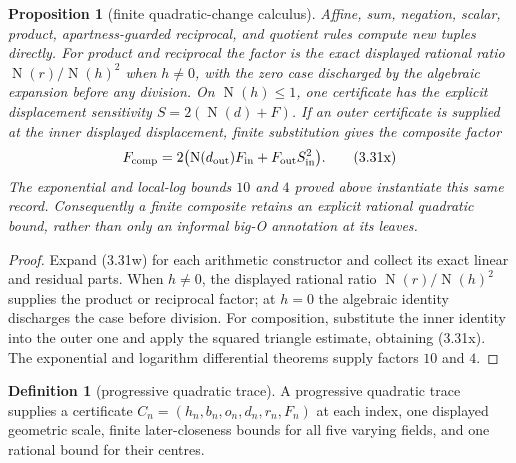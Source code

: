 \documentclass[10pt]{article}
\newtheorem{proposition}[theorem]{Proposition}
\theoremstyle{definition}
\newtheorem{definition}[theorem]{Definition}
\theoremstyle{remark}
\newcommand{\Norm}{\operatorname{N}}
\begin{document}
\begin{proposition}[finite quadratic-change calculus]
Affine, sum, negation, scalar, product, apartness-guarded reciprocal, and
quotient rules compute new tuples directly.  For product and reciprocal the
factor is the exact displayed rational ratio
$\Norm(r)/\Norm(h)^2$ when $h\ne0$, with the zero case discharged by the
algebraic expansion before any division.  On $\Norm(h)\le1$, one certificate
has the explicit displacement sensitivity
$S=2(\Norm(d)+F)$.  If an outer certificate is supplied at the inner displayed
displacement, finite substitution gives the composite factor
\[
 F_{\rm comp}=2\bigl(\Norm(d_{\rm out})F_{\rm in}
              +F_{\rm out}S_{\rm in}^{2}\bigr).
 \tag{3.31x}
\]
The exponential and local-log bounds $10$ and $4$ proved above instantiate
this same record.  Consequently a finite composite retains an explicit
rational quadratic bound, rather than only an informal big-O annotation at
its leaves.
\end{proposition}

\begin{proof}
Expand (3.31w) for each arithmetic constructor and collect its exact linear
and residual parts.  When $h\ne0$, the displayed rational ratio
$\Norm(r)/\Norm(h)^2$ supplies the product or reciprocal factor; at $h=0$ the
algebraic identity discharges the case before division.  For composition,
substitute the inner identity into the outer one and apply the squared
triangle estimate, obtaining (3.31x).  The exponential and logarithm
differential theorems supply factors $10$ and $4$.
\end{proof}

\begin{definition}[progressive quadratic trace]
A progressive quadratic trace supplies a certificate
$C_n=(h_n,b_n,o_n,d_n,r_n,F_n)$ at each index, one displayed geometric scale,
finite later-closeness bounds for all five varying fields, and one rational
bound for their centres.
\end{definition}
\end{document}
